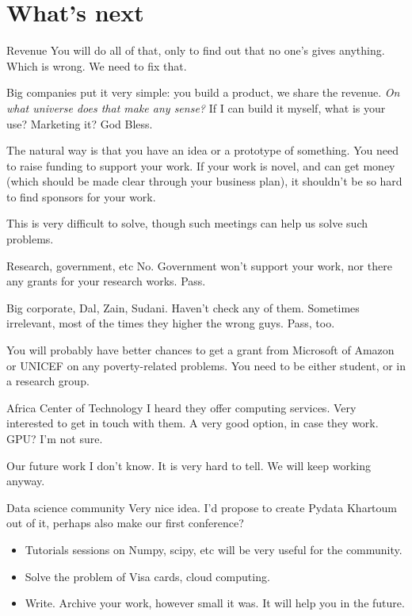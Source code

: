 \documentclass{beamer}
\begin{document}
\section{What's next}
\begin{frame}{Revenue}
  You will do all of that, only to find out that no one's gives anything. Which
  is wrong. We need to fix that.

  Big companies put it very simple: you build a product, we share the revenue.
  \textit{On what universe does that make any sense?} If I can build it myself,
  what is your use? Marketing it? God Bless.

  The natural way is that you have an idea or a prototype of something. You need
  to raise funding to support your work. If your work is novel, and can get
  money (which should be made clear through your business plan), it shouldn't be
  so hard to find sponsors for your work.

  This is very difficult to solve, though such meetings can help us solve such problems.
\end{frame}
\begin{frame}{Research, government, etc}
  No. Government won't support your work, nor there any grants for your research
  works. Pass.

  Big corporate, Dal, Zain, Sudani. Haven't check any of them. Sometimes
  irrelevant, most of the times they higher the wrong guys. Pass, too.

  You will probably have better chances to get a grant from Microsoft of Amazon
  or UNICEF on any poverty-related problems. You need to be either student, or
  in a research group.
  
\end{frame}

\begin{frame}{Africa Center of Technology}
  I heard they offer computing services. Very interested to get in touch with
  them. A very good option, in case they work. GPU? I'm not sure.
\end{frame}

\begin{frame}{Our future work}
I don't know. It is very hard to tell. We will keep working anyway.  
\end{frame}

\begin{frame}{Data science community}
  Very nice idea. I'd propose to create Pydata Khartoum out of it, perhaps also
  make our first conference?
  \begin{itemize}
    
  \item Tutorials sessions on Numpy, scipy, etc will be very useful for the community.
  \item Solve the problem of Visa cards, cloud computing.
    \item Write. Archive your work, however small it was. It will help you in
      the future.
  \end{itemize}
\end{frame}
\end{document}
